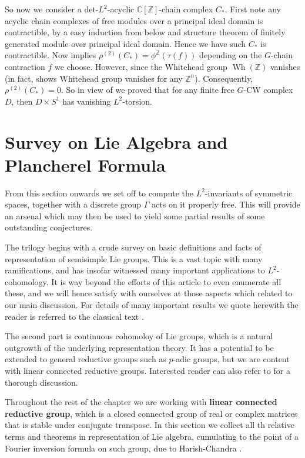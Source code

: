 \documentclass[11pt]{report}
\theoremstyle{definition}
\theoremstyle{plain}
\DeclareMathOperator{\Wh}{Wh}
\newcommand{\complex}{\mathbb{C}}
\newcommand{\integer}{\mathbb{Z}}
\begin{document}
So now we consider a det-$L^2$-acyclic $\complex[\integer]$-chain complex $C_*$. First note any acyclic chain complexes of free modules over a principal ideal domain is contractible, by a easy induction from below and structure theorem of finitely generated module over principal ideal domain. Hence we have such $C_*$ is contractible. Now  implies $\rho^{(2)}(C_*)=\phi^\integer(\tau(f))$ depending on the $G$-chain contraction $f$ we choose. However, since the Whitehead group $\Wh(\integer)$ vanishes (in fact, \cite{bass1964} shows Whitehead group vanishes for any $\integer^n$). Consequently, $\rho^{(2)}(C_*)=0$. So in view of  we proved that for any finite free $G$-CW complex $D$, then $D\times S^1$ has vanishing $L^2$-torsion.



\section{Survey on Lie Algebra and Plancherel Formula}
From this section onwards we set off to compute the $L^2$-invariants of symmetric spaces, together with a discrete group $\Gamma$ acts on it properly free. This will provide an arsenal which may then be used to yield some partial results of some outstanding conjectures.
\par The trilogy begins with a crude survey on basic definitions and facts of representation of semisimple Lie groups. This is a vast topic with many ramifications, and has insofar witnessed many important applications to $L^2$-cohomology. It is way beyond the efforts of this article to even enumerate all these, and we will hence satisfy with ourselves at those aspects which related to our main discussion. For details of many important results we quote herewith the reader is referred to the classical text \cite{knapp2016}.
\par The second part is continuous cohomoloy of Lie groups, which is a natural outgrowth of the underlying representation theory. It has a potential to be extended to general reductive groups such as $p$-adic groups, but we are content with linear connected reductive groups. Interested reader can also refer to \cite{borel2013} for a thorough discussion.
\par Throughout the rest of the chapter we are working with \textbf{linear connected reductive group}, which is a closed connected group of real or complex matrices that is stable under conjugate transpose. In this section we collect all th relative terms and theorems in representation of Lie algebra, cumulating to the point of a Fourier inversion formula on such group, due to Harish-Chandra \cite{harish1976}.  
\end{document}
